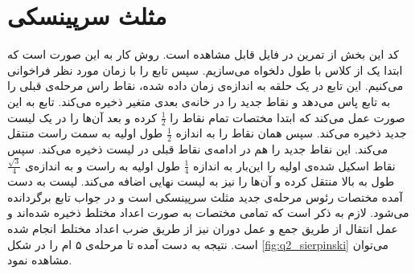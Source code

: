 \documentclass[11pt, a4paper]{article}
\begin{document}
\section{\textbf{مثلث سرپینسکی}}
کد این بخش از تمرین در فایل
قابل مشاهده است. روش کار به این صورت است که ابتدا یک
از کلاس
با طول دلخواه می‌سازیم. سپس تابع
را با زمان مورد نظر فراخوانی می‌کنیم. این تابع در یک حلقه به اندازه‌ی زمان داده شده، نقاط راس مرحله‌ی قبلی را به تابع
پاس می‌دهد و نقاط جدید را در خانه‌ی بعدی متغیر
ذخیره می‌کند. تابع
به این صورت عمل می‌کند که ابتدا مختصات تمام نقاط را
$\frac{1}{2}$
کرده و بعد آن‌ها را در یک لیست جدید ذخیره می‌کند. سپس همان نقاط را به اندازه 
$\frac{1}{2}$
طول اولیه به سمت راست منتقل می‌کند. این نقاط جدید را هم در ادامه‌‌ی نقاط قبلی در لیست ذخیره می‌کند. سپس نقاط اسکیل شده‌ی اولیه را این‌بار به اندازه‌
$\frac{1}{4}$
طول اولیه به راست و به اندازه‌ی 
$\frac{\sqrt{3}}{4}$
طول به بالا منتقل کرده و آن‌ها را نیز به لیست نهایی اضافه می‌کند. لیست به دست‌ آمده مختصات رئوس مرحله‌ی جدید مثلث سرپینسکی است و در جواب تابع برگردانده می‌شود. لازم به ذکر است که تمامی مختصات به صورت اعداد مختلط ذخیره شده‌اند و عمل انتقال از طریق جمع و عمل دوران نیز از طریق ضرب اعداد مختلط انجام شده است.
نتیجه به دست آمده تا مرحله‌ی ۵ ام را در شکل
\ref{fig:q2_sierpinski}
می‌توان مشاهده نمود.
\end{document}
